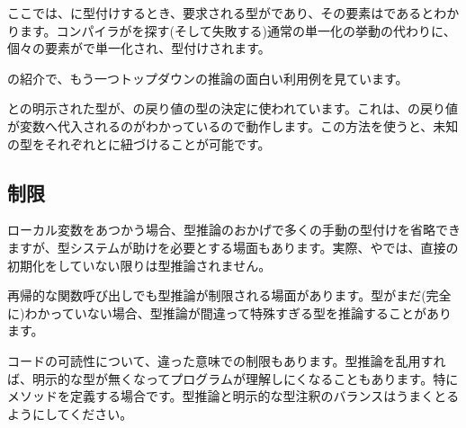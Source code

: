 
ここでは、\expr{[1, "foo"]}に型付けするとき、要求される型がであり、その要素はであるとわかります。コンパイラがを探す(そして失敗する)通常の単一化の挙動の代わりに、個々の要素がで単一化され、型付けされます。

の紹介で、もう一つトップダウンの推論の面白い利用例を見ています。


との明示された型が、の戻り値の型の決定に使われています。これは、の戻り値が変数へ代入されるのがわかっているので動作します。この方法を使うと、未知の型をそれぞれとに紐づけることが可能です。





\subsection{制限}
\label{type-system-inference-limitations}

ローカル変数をあつかう場合、型推論のおかげで多くの手動の型付けを省略できますが、型システムが助けを必要とする場面もあります。実際、やでは、直接の初期化をしていない限りは型推論されません。

再帰的な関数呼び出しでも型推論が制限される場面があります。型がまだ(完全に)わかっていない場合、型推論が間違って特殊すぎる型を推論することがあります。

コードの可読性について、違った意味での制限もあります。型推論を乱用すれば、明示的な型が無くなってプログラムが理解しにくなることもあります。特にメソッドを定義する場合です。型推論と明示的な型注釈のバランスはうまくとるようにしてください。

